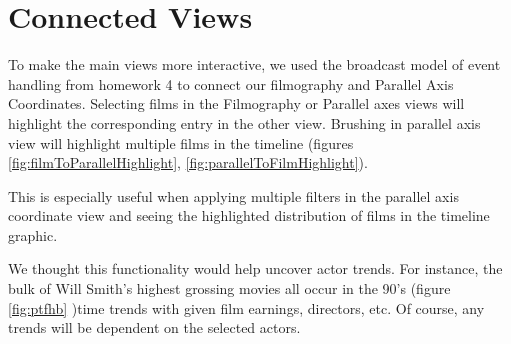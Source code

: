 \documentclass[12pt]{article}
\begin{document}
\newpage



\section{Connected Views}

To make the main views more interactive, we used the broadcast model of event handling from homework 4 to connect our filmography and Parallel Axis Coordinates. Selecting films in the Filmography or Parallel axes views will highlight the corresponding entry in the other view.  Brushing in parallel axis view will highlight multiple films in the timeline (figures \ref{fig:filmToParallelHighlight}, 
\ref{fig:parallelToFilmHighlight}).

This is especially useful when applying multiple filters in the parallel axis coordinate view and seeing the highlighted distribution of films in the timeline graphic.

We thought this functionality would help uncover actor trends.  For instance, the bulk of Will Smith's highest grossing movies all occur in the 90's (figure \ref{fig:ptfhb} )time trends with given film earnings, directors, etc.  Of course, any trends will be dependent on the selected actors.
\end{document}
